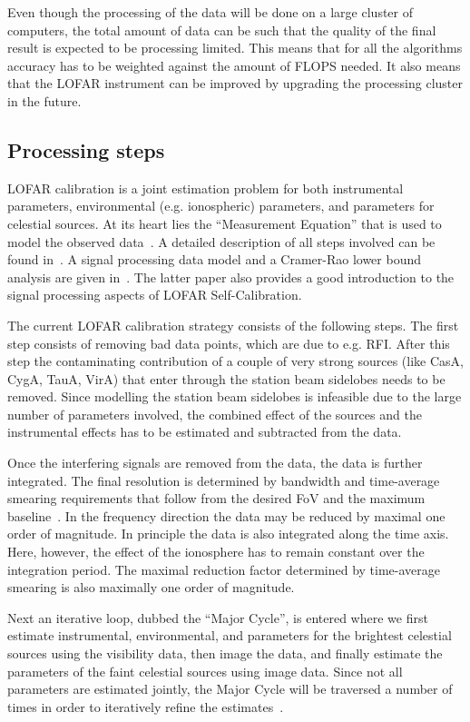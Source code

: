 \documentclass[journal]{IEEEtran}
\begin{document}
Even though the processing of the data will be done on a large cluster of computers, the total amount of data can be such that the quality of the final result is expected to be processing limited. This means that for all the algorithms accuracy has to be weighted against the amount of FLOPS needed. It also means that the LOFAR instrument can be improved by upgrading the processing cluster in the future. 

\subsection{Processing steps}

LOFAR calibration is a joint estimation problem for both instrumental parameters, environmental (e.g. ionospheric) parameters, and parameters for celestial sources. At its heart lies the ``Measurement Equation'' that is used to model the observed data~\cite{Hamaker:96}. A detailed description of all steps involved can be found in~\cite{Noordam:06}. A signal processing data model and a Cramer-Rao lower bound analysis are given in~\cite{Tol:07}. The latter paper also provides a good introduction to the signal processing aspects of LOFAR Self-Calibration.   

\label{sec:RFI}
The current LOFAR calibration strategy consists of the following steps. The first step consists of removing bad data points, which are due to e.g. RFI. After this step the contaminating contribution of a couple of very strong sources (like CasA, CygA, TauA, VirA) that enter through the station beam sidelobes needs to be removed. Since modelling the station beam sidelobes is infeasible due to the large number of parameters involved, the combined effect of the sources and the instrumental effects has to be estimated and subtracted from the data. 

Once the interfering signals are removed from the data, the data is further integrated. The final resolution is determined by bandwidth and time-average smearing requirements that follow from the desired FoV and the maximum baseline~\cite{SIRAII:99}. In the frequency direction the data may be reduced by maximal one order of magnitude. In principle the data is also integrated along the time axis. Here, however, the effect of the ionosphere has to remain constant over the integration period. The maximal reduction factor determined by time-average smearing is also maximally one order of magnitude.

Next an iterative loop, dubbed the ``Major Cycle'', is entered where we first estimate instrumental, environmental, and parameters for the brightest celestial sources using the visibility data, then image the data, and finally estimate  the parameters of the faint celestial sources using image data. Since not all parameters are estimated jointly, the Major Cycle will be traversed a number of times in order to iteratively refine the estimates~\cite{Noordam:06,Nijboer:07}. 
\end{document}
